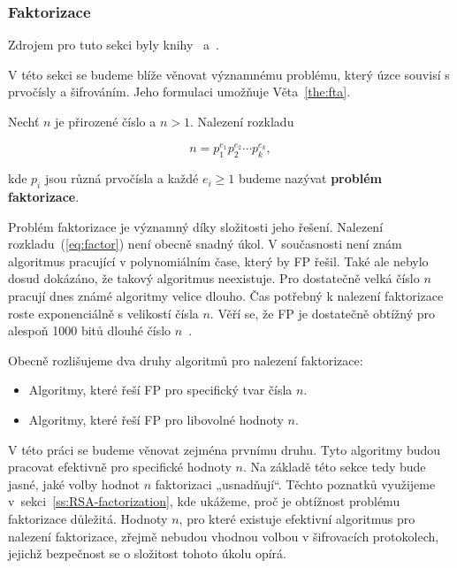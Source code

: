 \documentclass[
  program=infoi,
  biblatex=false,
  figures=true,
  glossaries,
  tables=false,
  sourcecodes=true,
  index
]{kidiplom}
\begin{document}
    \subsubsection{Faktorizace}\label{ss:factorization}

        Zdrojem pro tuto sekci byly knihy~\cite{handbook} a~\cite{primes-and-factorization}.

        V této sekci se budeme blíže věnovat významnému problému, který úzce souvisí s prvočísly
        a šifrováním.
        Jeho formulaci umožňuje Věta~\ref{the:fta}.

        \begin{definition}

            Nechť $n$ je přirozené číslo a $n > 1$. 
            Nalezení rozkladu
            
            \begin{equation}\label{eq:factor}
                n = p_1^{e_1} p_2^{e_2} \cdots p_k^{e_k},
            \end{equation}

            \noindent
            kde $p_i$ jsou různá prvočísla a každé $e_i \geq 1$ budeme nazývat \textbf{problém faktorizace}.

        \end{definition}

        Problém faktorizace je významný díky složitosti jeho řešení.
        Nalezení rozkladu~(\ref{eq:factor}) není obecně snadný úkol.
        V současnosti není znám algoritmus pracující v polynomiálním čase, který by FP řešil.
        Také ale nebylo dosud dokázáno, že takový algoritmus neexistuje.
        Pro dostatečně velká číslo $n$ pracují dnes známé algoritmy velice dlouho.
        Čas potřebný k nalezení faktorizace roste exponenciálně s velikostí čísla $n$.
        Věří se, že FP je dostatečně obtížný pro alespoň 1000 bitů dlouhé číslo $n$~\cite{graduate-course}.

        Obecně rozlišujeme dva druhy algoritmů pro nalezení faktorizace:

        \begin{itemize}
            \item 
                Algoritmy, které řeší FP pro specifický tvar čísla $n$.
            \item
                Algoritmy, které řeší FP pro libovolné hodnoty $n$.
        \end{itemize}

        V této práci se budeme věnovat zejména prvnímu druhu.
        Tyto algoritmy budou pracovat efektivně pro specifické hodnoty $n$.
        Na základě této sekce tedy bude jasné, jaké volby hodnot $n$ faktorizaci „usnadňují“.
        Těchto poznatků využijeme v~sekci~\ref{ss:RSA-factorization}, kde ukážeme, proč je
        obtížnost problému faktorizace důležitá.
        Hodnoty $n$, pro které existuje efektivní algoritmus pro nalezení faktorizace, zřejmě nebudou vhodnou volbou
        v šifrovacích protokolech, jejichž bezpečnost se o složitost tohoto úkolu opírá.
\end{document}
